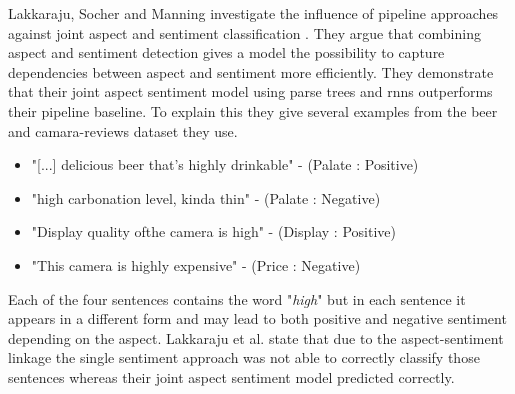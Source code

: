 Lakkaraju, Socher and Manning investigate the influence of pipeline approaches against joint aspect and sentiment classification \cite{Lakkaraju2014}. They argue that combining aspect and sentiment detection gives a model the possibility to capture dependencies between aspect and sentiment more efficiently. They demonstrate that their joint aspect sentiment model using parse trees and \glspl{rnn} outperforms their pipeline baseline. To explain this they give several examples from the beer \cite{McAuley2012, McAuley2013b} and camara-reviews dataset they use. 

\begin{itemize}
	\item "{[...]} delicious beer that’s highly drinkable" - {(Palate : Positive)}
	\item "high carbonation level, kinda thin" - {(Palate : Negative)}
	\item "Display quality ofthe camera is high" - {(Display : Positive)}
	\item "This camera is highly expensive" - {(Price : Negative)}
\end{itemize}

Each of the four sentences contains the word "\textit{high}" but in each sentence it appears in a different form and may lead to both positive and negative sentiment depending on the aspect. Lakkaraju et al. state that due to the aspect-sentiment linkage the single sentiment approach was not able to correctly classify those sentences whereas their joint aspect sentiment model predicted correctly.
\medskip

